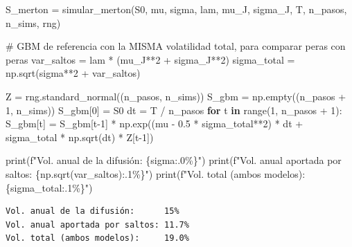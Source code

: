 \documentclass[
  spanish,
  letterpaper,
  DIV=11,
  numbers=noendperiod]{scrreprt}
\newenvironment{Shaded}{\begin{snugshade}}{\end{snugshade}}
\newcommand{\BuiltInTok}[1]{\textcolor[rgb]{0.00,0.23,0.31}{#1}}
\newcommand{\CommentTok}[1]{\textcolor[rgb]{0.37,0.37,0.37}{#1}}
\newcommand{\ControlFlowTok}[1]{\textcolor[rgb]{0.00,0.23,0.31}{\textbf{#1}}}
\newcommand{\DecValTok}[1]{\textcolor[rgb]{0.68,0.00,0.00}{#1}}
\newcommand{\FloatTok}[1]{\textcolor[rgb]{0.68,0.00,0.00}{#1}}
\newcommand{\KeywordTok}[1]{\textcolor[rgb]{0.00,0.23,0.31}{\textbf{#1}}}
\newcommand{\NormalTok}[1]{\textcolor[rgb]{0.00,0.23,0.31}{#1}}
\newcommand{\OperatorTok}[1]{\textcolor[rgb]{0.37,0.37,0.37}{#1}}
\newcommand{\SpecialCharTok}[1]{\textcolor[rgb]{0.37,0.37,0.37}{#1}}
\newcommand{\SpecialStringTok}[1]{\textcolor[rgb]{0.13,0.47,0.30}{#1}}
\begin{document}
\begin{Shaded}
\begin{Highlighting}[]
\NormalTok{S\_merton }\OperatorTok{=}\NormalTok{ simular\_merton(S0, mu, sigma, lam, mu\_J, sigma\_J, T, n\_pasos, n\_sims, rng)}

\CommentTok{\# GBM de referencia con la MISMA volatilidad total, para comparar peras con peras}
\NormalTok{var\_saltos }\OperatorTok{=}\NormalTok{ lam }\OperatorTok{*}\NormalTok{ (mu\_J}\OperatorTok{**}\DecValTok{2} \OperatorTok{+}\NormalTok{ sigma\_J}\OperatorTok{**}\DecValTok{2}\NormalTok{)}
\NormalTok{sigma\_total }\OperatorTok{=}\NormalTok{ np.sqrt(sigma}\OperatorTok{**}\DecValTok{2} \OperatorTok{+}\NormalTok{ var\_saltos)}

\NormalTok{Z }\OperatorTok{=}\NormalTok{ rng.standard\_normal((n\_pasos, n\_sims))}
\NormalTok{S\_gbm }\OperatorTok{=}\NormalTok{ np.empty((n\_pasos }\OperatorTok{+} \DecValTok{1}\NormalTok{, n\_sims))}
\NormalTok{S\_gbm[}\DecValTok{0}\NormalTok{] }\OperatorTok{=}\NormalTok{ S0}
\NormalTok{dt }\OperatorTok{=}\NormalTok{ T }\OperatorTok{/}\NormalTok{ n\_pasos}
\ControlFlowTok{for}\NormalTok{ t }\KeywordTok{in} \BuiltInTok{range}\NormalTok{(}\DecValTok{1}\NormalTok{, n\_pasos }\OperatorTok{+} \DecValTok{1}\NormalTok{):}
\NormalTok{    S\_gbm[t] }\OperatorTok{=}\NormalTok{ S\_gbm[t}\OperatorTok{{-}}\DecValTok{1}\NormalTok{] }\OperatorTok{*}\NormalTok{ np.exp((mu }\OperatorTok{{-}} \FloatTok{0.5} \OperatorTok{*}\NormalTok{ sigma\_total}\OperatorTok{**}\DecValTok{2}\NormalTok{) }\OperatorTok{*}\NormalTok{ dt}
                                   \OperatorTok{+}\NormalTok{ sigma\_total }\OperatorTok{*}\NormalTok{ np.sqrt(dt) }\OperatorTok{*}\NormalTok{ Z[t}\OperatorTok{{-}}\DecValTok{1}\NormalTok{])}

\BuiltInTok{print}\NormalTok{(}\SpecialStringTok{f"Vol. anual de la difusión:      }\SpecialCharTok{\{}\NormalTok{sigma}\SpecialCharTok{:.0\%\}}\SpecialStringTok{"}\NormalTok{)}
\BuiltInTok{print}\NormalTok{(}\SpecialStringTok{f"Vol. anual aportada por saltos: }\SpecialCharTok{\{}\NormalTok{np}\SpecialCharTok{.}\NormalTok{sqrt(var\_saltos)}\SpecialCharTok{:.1\%\}}\SpecialStringTok{"}\NormalTok{)}
\BuiltInTok{print}\NormalTok{(}\SpecialStringTok{f"Vol. total (ambos modelos):     }\SpecialCharTok{\{}\NormalTok{sigma\_total}\SpecialCharTok{:.1\%\}}\SpecialStringTok{"}\NormalTok{)}
\end{Highlighting}
\end{Shaded}

\begin{verbatim}
Vol. anual de la difusión:      15%
Vol. anual aportada por saltos: 11.7%
Vol. total (ambos modelos):     19.0%
\end{verbatim}
\end{document}

